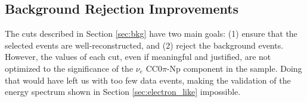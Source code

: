 \subsection{Background Rejection Improvements}
The cuts described in Section \ref{sec:bkg} have two main goals: (1) ensure that the selected events are well-reconstructed, and (2) reject the background events. However, the values of each cut, even if meaningful and justified, are not optimized to the significance of the $\nu_e$ CC0$\pi$-Np component in the sample. Doing that would have left us with too few data events, making the validation of the energy spectrum shown in Section \ref{sec:electron_like} impossible. 
